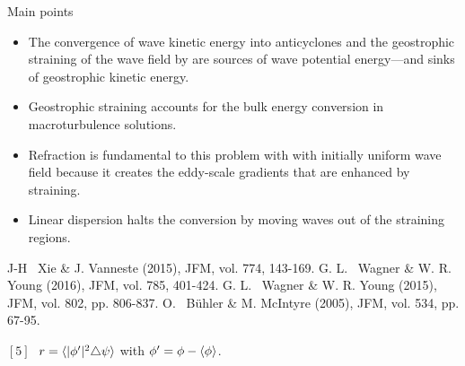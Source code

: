 \documentclass[final]{beamer}
\begin{document}
\begin{frame}[t]
\begin{columns}[t]
\begin{column}{0.55\textwidth}
\begin{columns}
\begin{column}{0.475\textwidth}
{\begin{alertblock}{Main points}
                          \begin{itemize}
                              \item The convergence of wave kinetic energy into
                                    anticyclones and the geostrophic straining of
                                    the wave field by are sources of wave potential
                                    energy---and sinks of geostrophic kinetic energy.
                              \item Geostrophic straining accounts for the bulk
                                    energy conversion in macroturbulence solutions.
                              \item Refraction is fundamental to this problem with
                                    with initially uniform wave field because
                                    it creates the  eddy-scale gradients that are
                                    enhanced by straining.
                              \item Linear dispersion halts the conversion by moving
                                    waves out of the straining regions.
                          \end{itemize}

                      \end{alertblock}
                      }

                          \begin{block}{}
                            \small{\begin{thebibliography}{99}
                             J-H~ Xie \& J. Vanneste (2015), JFM,
                                            vol. 774, 143-169.
                             G. L.~ Wagner \& W. R. Young (2016), JFM,
                                            vol. 785, 401-424.
                             G. L.~ Wagner \& W. R. Young (2015), JFM,
                                            vol. 802, pp. 806-837.
                             O.~ B{\"u}hler \& M. McIntyre (2005), JFM,
                                            vol. 534, pp. 67-95.

                            \end{thebibliography}}
                            \vspace{.4cm}
                            $[5]$\,\, $r=\langle |\phi'|^2 \triangle\psi \rangle$
                                     with $\phi' = \phi-\langle\phi\rangle$.


\end{block}
\end{column}
\end{columns}
\end{column}
\end{columns}
\end{frame}
\end{document}
